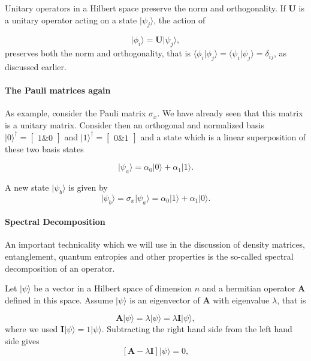 Unitary operators in a Hilbert space preserve the norm and orthogonality. If $\bm{U}$ is a unitary operator acting on a state $\vert \psi_j\rangle$, the action of

\[
\vert \phi_i\rangle=\bm{U}\vert \psi_j\rangle,
\]
preserves both the norm and orthogonality, that is $\langle \phi_i \vert \phi_j\rangle=\langle \psi_i \vert \psi_j\rangle=\delta_{ij}$, as discussed earlier.


\paragraph{The Pauli matrices again}

As example, consider the Pauli matrix $\sigma_x$. We have already seen that this matrix is a unitary matrix. Consider then an orthogonal and normalized basis $\vert 0\rangle^{\dagger} =\begin{bmatrix} 1 {\&} 0\end{bmatrix}$ and $\vert 1\rangle^{\dagger} =\begin{bmatrix} 0 {\&} 1\end{bmatrix}$ and a state which is a linear superposition of these two basis states

\[
\vert \psi_a\rangle=\alpha_0\vert 0\rangle +\alpha_1\vert 1\rangle.
\]

A new state $\vert \psi_b\rangle$ is given by
\[
\vert \psi_b\rangle=\sigma_x\vert \psi_a\rangle=\alpha_0\vert 1\rangle +\alpha_1\vert 0\rangle.
\]


\paragraph{Spectral Decomposition}

An important technicality which we will use in the discussion of
density matrices, entanglement, quantum entropies and other properties
is the so-called spectral decomposition of an operator.

Let $\vert \psi\rangle$ be a vector in a Hilbert space of dimension $n$ and a hermitian operator $\bm{A}$ defined in this
space. Assume $\vert \psi\rangle$ is an eigenvector of $\bm{A}$ with eigenvalue $\lambda$, that is

\[
\bm{A}\vert \psi\rangle = \lambda\vert \psi\rangle = \lambda \bm{I}\vert \psi \rangle,
\]
where we used $\bm{I}\vert \psi \rangle = 1 \vert \psi \rangle$.
Subtracting the right hand side from the left hand side gives
\[
\left[\bm{A}-\lambda \bm{I}\right]\vert \psi \rangle=0,
\]

